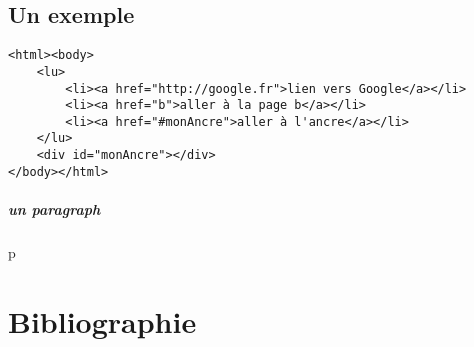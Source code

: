 \documentclass[a4paper]{report}
\begin{document}
\section*{Un exemple\\}
\begin{verbatim}
<html><body>
	<lu>
		<li><a href="http://google.fr">lien vers Google</a></li>
		<li><a href="b">aller à la page b</a></li>
		<li><a href="#monAncre">aller à l'ancre</a></li>
	</lu>
	<div id="monAncre"></div>
</body></html>
\end{verbatim}

\paragraph*{un paragraph}
p


\chapter*{Bibliographie}
\end{document}
